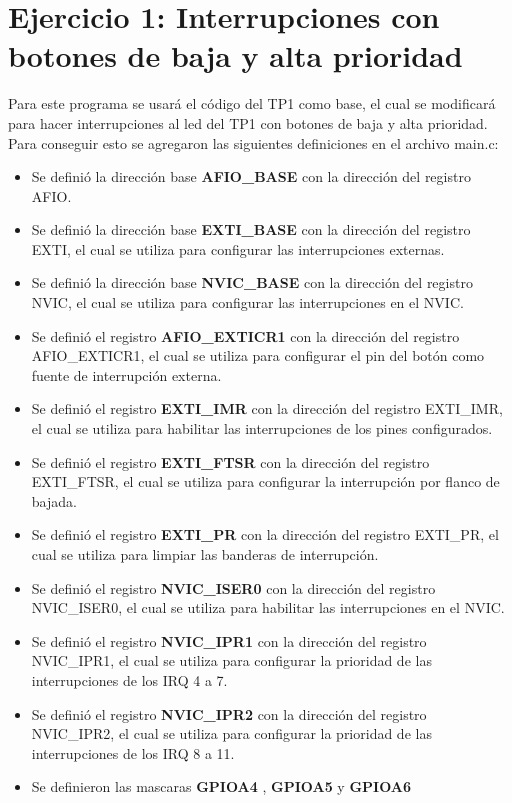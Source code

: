 \raggedbottom

\section{Ejercicio 1: Interrupciones con botones de baja y alta prioridad
}
Para este programa se usará el código del TP1 como base, el cual se modificará para hacer interrupciones al led del TP1 con botones de baja y alta prioridad.
Para conseguir esto se agregaron las siguientes definiciones en el archivo main.c:

\begin{itemize}
    \item Se definió la dirección base \textbf{AFIO\_BASE} con la dirección del registro AFIO.
    \item Se definió la dirección base \textbf{EXTI\_BASE} con la dirección del registro EXTI, el cual se utiliza para configurar las interrupciones externas.
    \item Se definió la dirección base \textbf{NVIC\_BASE} con la dirección del registro NVIC, el cual se utiliza para configurar las interrupciones en el NVIC.
    \item Se definió el registro \textbf{AFIO\_EXTICR1} con la dirección del registro AFIO\_EXTICR1, el cual se utiliza para configurar el pin del botón como fuente de interrupción externa.
    \item Se definió el registro \textbf{EXTI\_IMR} con la dirección del registro EXTI\_IMR, el cual se utiliza para habilitar las interrupciones de los pines configurados.
    \item Se definió el registro \textbf{EXTI\_FTSR} con la dirección del registro EXTI\_FTSR, el cual se utiliza para configurar la interrupción por flanco de bajada.
    \item Se definió el registro \textbf{EXTI\_PR} con la dirección del registro EXTI\_PR, el cual se utiliza para limpiar las banderas de interrupción.
    \item Se definió el registro \textbf{NVIC\_ISER0} con la dirección del registro NVIC\_ISER0, el cual se utiliza para habilitar las interrupciones en el NVIC.
    \item Se definió el registro \textbf{NVIC\_IPR1} con la dirección del registro NVIC\_IPR1, el cual se utiliza para configurar la prioridad de las interrupciones de los IRQ 4 a 7.
    \item Se definió el registro \textbf{NVIC\_IPR2} con la dirección del registro NVIC\_IPR2, el cual se utiliza para configurar la prioridad de las interrupciones de los IRQ 8 a 11.
    \item Se definieron las mascaras \textbf{GPIOA4} , \textbf{GPIOA5} y \textbf{GPIOA6}
\end{itemize}


